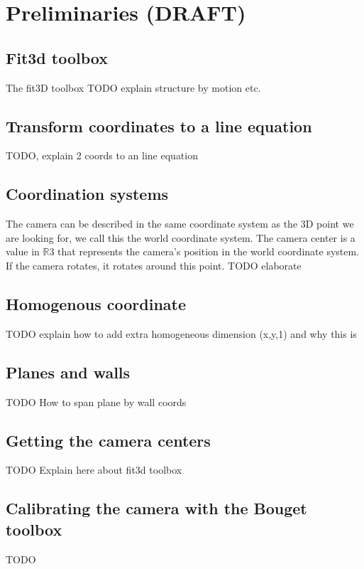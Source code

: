 \section{Preliminaries (DRAFT)}
\subsection{Fit3d toolbox}
The fit3D toolbox \cite{Fit3d} 
TODO explain structure by motion etc.

\subsection{Transform coordinates to a line equation}
TODO, explain 2 coords to an line equation


\subsection{Coordination systems}
The camera can be described in the same coordinate system as the 3D point we are
looking for, we call this the world coordinate system. 
The camera center is a value in $\mathbb{R}$3 that represents the camera's position in the world
coordinate system. If the camera rotates, it rotates around this point.
TODO elaborate\\

\subsection{Homogenous coordinate}
TODO explain how to add extra homogeneous dimension (x,y,1) and why this is


\subsection{Planes and walls}
TODO How to span plane by wall coords

\subsection{Getting the camera centers}
TODO Explain here about fit3d toolbox

\subsection{Calibrating the camera with the Bouget toolbox}
TODO


